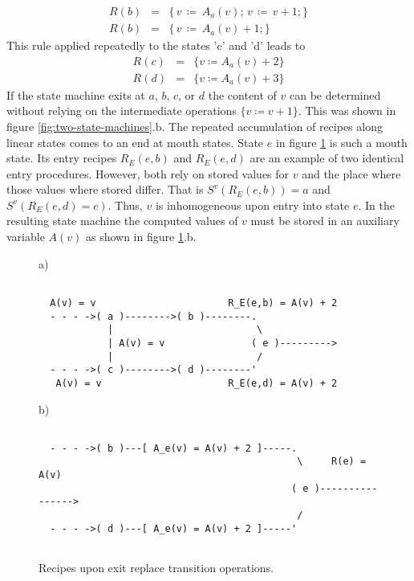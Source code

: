 \documentclass[12pt,a4paper]{scrartcl}
\begin{document}
\begin{eqnarray}
    R(b)&=&\{\,v\,\coloneqq \,A_a(v);\,v\,\coloneqq \,v + 1;\} \\
    R(b)&=&\{\,v\,\coloneqq \,A_a(v) + 1; \}                                 
\end{eqnarray}
This rule applied repeatedly to the states 'c' and 'd' leads to
\begin{eqnarray}
    R(c) &=&\{ v \coloneqq  A_a(v) + 2 \} \\
    R(d) &=&\{ v \coloneqq  A_a(v) + 3 \}                                 
\end{eqnarray}
If the state machine exits at $a$, $b$, $c$, or $d$ the content of $v$ can be
determined without relying on the intermediate operations $\{ v\coloneqq v+1 \}$. This
was shown in figure \ref{fig:two-state-machines}.b. 
The repeated accumulation of recipes along linear states comes to an end at
mouth states. State $e$ in figure \ref{fig:interference-example} is such a
mouth state. Its entry recipes $R_E(e,b)$ and $R_E(e,d)$ are an example of two
identical entry procedures. However, both rely on stored values for $v$ and the
place where those values where stored differ. That is $S^v(R_E(e,b))=a$ and
$S^v(R_E(e,d)=c)$. Thus, $v$ is inhomogeneous upon entry into state $e$.  In
the resulting state machine the computed values of $v$ must be stored in an
auxiliary variable $A(v)$ as shown in figure \ref{fig:interference-example}.b.
\begin{figure}[htbp] \leavevmode \label{fig:interference-example}
a)
\begin{verbatim}

  A(v) = v                       R_E(e,b) = A(v) + 2
  - - - ->( a )-------->( b )--------.
            |                         \
            | A(v) = v               ( e )--------->
            |                         /
  - - - ->( c )-------->( d )--------'
   A(v) = v                      R_E(e,d) = A(v) + 2

\end{verbatim}
b)
\begin{verbatim}
                                 
  - - - ->( b )---[ A_e(v) = A(v) + 2 ]-----.
                                             \     R(e) = A(v)
                                            ( e )---------------->
                                             /
  - - - ->( d )---[ A_e(v) = A(v) + 2 ]-----'
                                 

\end{verbatim}
\caption{Recipes upon exit replace transition operations.}
\end{figure}
\end{document}
